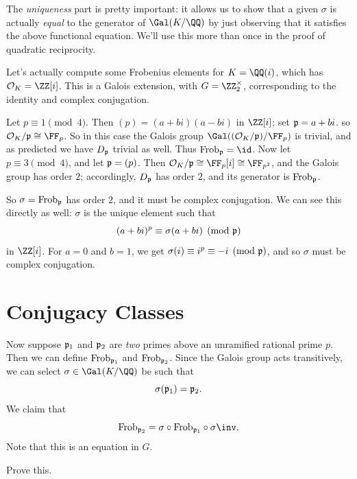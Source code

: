 The \emph{uniqueness} part is pretty important:
it allows us to show that a given $\sigma$ is actually \emph{equal}
to the generator of $\Gal(K/\QQ)$ by just observing that it satisfies
the above functional equation.
We'll use this more than once in the proof of quadratic reciprocity.

\begin{example}
	Let's actually compute some Frobenius elements for $K = \QQ(i)$,
	which has $\OO_K = \ZZ[i]$.
	This is a Galois extension, with $G = \Zm2$, corresponding to the identity
	and complex conjugation.
	\begin{enumerate}[(a)]
		\ii Let $p \equiv 1 \pmod 4$.
		Then $(p) = (a+bi)(a-bi)$ in $\ZZ[i]$; set $\mathfrak p = a + bi$.
		so $\OO_K / \pp \cong \FF_p$.
		So in this case the Galois group $\Gal( (\OO_K/\pp) / \FF_p )$
		is trivial, and as predicted we have $D_\mathfrak p$ trivial as well.
		Thus $\Frob_\pp = \id$.
		\ii Now let $p \equiv 3 \pmod 4$, and let $\mathfrak p = (p)$.
		Then $\OO_K / \pp \cong \FF_p[i] \cong \FF_{p^2}$, and the Galois group has order $2$;
		accordingly, $D_\mathfrak p$ has order $2$, and its generator is $\mathrm{Frob}_\mathfrak p$.

		So $\sigma = \mathrm{Frob}_\mathfrak p$ has order $2$, and it must be complex conjugation.
		We can see this directly as well: $\sigma$ is the unique element such that
		\[ (a+bi)^p \equiv \sigma(a+bi) \pmod{\mathfrak p} \]
		in $\ZZ[i]$.
		For $a=0$ and $b=1$, we get $\sigma(i) \equiv i^p \equiv -i \pmod{\mathfrak p}$,
		and so $\sigma$ must be complex conjugation.
	\end{enumerate}
\end{example}

\section{Conjugacy Classes}
Now suppose $\mathfrak p_1$ and $\mathfrak p_2$ are \emph{two} primes above an unramified rational prime $p$.
Then we can define $\mathrm{Frob}_{\mathfrak p_1}$ and $\mathrm{Frob}_{\mathfrak p_2}$.
Since the Galois group acts transitively,
we can select $\sigma \in \Gal(K/\QQ)$ be such that
\[ \sigma(\mathfrak p_1) = \mathfrak p_2. \]
We claim that
\[
	\Frob_{\pp_2} = \sigma \circ \Frob_{\pp_1} \circ \sigma\inv.
\]
Note that this is an equation in $G$.
\begin{ques}
	Prove this.
\end{ques}

